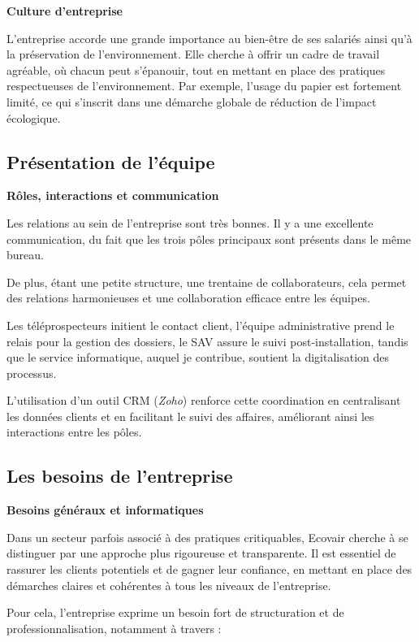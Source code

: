 \textbf{Culture d’entreprise}

L'entreprise accorde une grande importance au bien-être de ses salariés ainsi qu'à la préservation de l’environnement. Elle cherche à offrir un cadre de travail agréable, où chacun peut s’épanouir, tout en mettant en place des pratiques respectueuses de l’environnement. Par exemple, l’usage du papier est fortement limité, ce qui s’inscrit dans une démarche globale de réduction de l’impact écologique.

\subsection{Présentation de l’équipe}

\textbf{Rôles, interactions et communication}

Les relations au sein de l’entreprise sont très bonnes. Il y a une excellente communication, du fait que les trois pôles principaux sont présents dans le même bureau.

De plus, étant une petite structure, une trentaine de collaborateurs, cela permet des relations harmonieuses et une collaboration efficace entre les équipes.

Les téléprospecteurs initient le contact client, l’équipe administrative prend le relais pour la gestion des dossiers, le SAV assure le suivi post-installation, tandis que le service informatique, auquel je contribue, soutient la digitalisation des processus.

L’utilisation d’un outil CRM (\textit{Zoho}) renforce cette coordination en centralisant les données clients et en facilitant le suivi des affaires, améliorant ainsi les interactions entre les pôles.

\subsection{Les besoins de l’entreprise}

\textbf{Besoins généraux et informatiques}

Dans un secteur parfois associé à des pratiques critiquables, Ecovair cherche à se distinguer par une approche plus rigoureuse et transparente. Il est essentiel de rassurer les clients potentiels et de gagner leur confiance, en mettant en place des démarches claires et cohérentes à tous les niveaux de l’entreprise.

Pour cela, l’entreprise exprime un besoin fort de structuration et de professionnalisation, notamment à travers :

